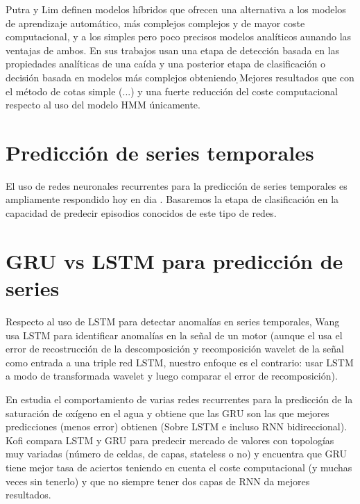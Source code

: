\documentclass[../tfm.tex]{subfiles}
\begin{document}
Putra \cite{Putra2017} y Lim \cite{Lim2014} definen modelos híbridos que ofrecen una alternativa a los modelos de aprendizaje automático, más complejos complejos y de mayor coste computacional, y a los simples pero poco precisos modelos analíticos aunando las ventajas de ambos. En sus trabajos usan una etapa de detección basada en las propiedades analíticas de una caída y una posterior etapa de clasificación o decisión basada en modelos más complejos obteniendo ̣{Mejores resultados que con el método de cotas simple (...) y una fuerte reducción del coste computacional respecto al uso del modelo HMM únicamente}.

\section{Predicción de series temporales}

El uso de redes neuronales recurrentes para la predicción de series temporales es ampliamente respondido hoy en dia . Basaremos la etapa de clasificación en la capacidad de predecir episodios conocidos de este tipo de redes.

\section{GRU vs LSTM para predicción de series}\label{sa_rnn}

Respecto al uso de LSTM para detectar anomalías en series temporales, Wang \cite{Wang2020}  usa LSTM para identificar anomalías en la señal de un motor (aunque el usa el error de recostrucción de la descomposición y recomposición wavelet de la señal como entrada a una triple red LSTM, nuestro enfoque es el contrario: usar LSTM a modo de transformada wavelet y luego comparar el error de recomposición).

En\cite{Qin2019} estudia el comportamiento de varias redes recurrentes para la predicción de la saturación de oxígeno en el agua y obtiene que las GRU son las que mejores predicciones (menos error) obtienen (Sobre LSTM e incluso RNN bidireccional). Kofi \cite{Koffi2020} compara LSTM y GRU para predecir mercado de valores con topologías muy variadas (número de celdas, de capas, stateless o no) y encuentra que GRU tiene mejor tasa de aciertos teniendo en cuenta el coste computacional (y muchas veces sin tenerlo) y que no siempre tener dos capas de RNN da mejores resultados.
\end{document}
